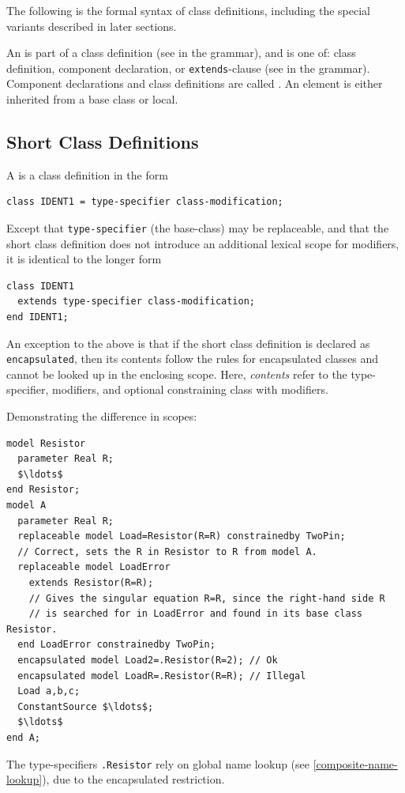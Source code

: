 The following is the formal syntax of class definitions, including the special variants described in later sections.

An  is part of a class definition (see  in the grammar), and is one of: class definition, component declaration, or \lstinline!extends!-clause (see  in the grammar).
Component declarations and class definitions are called .
An element is either inherited from a base class or local.

\subsection{Short Class Definitions}\label{short-class-definitions}

A  is a class definition in the form
\begin{lstlisting}[language=modelica]
class IDENT1 = type-specifier class-modification;
\end{lstlisting}
Except that \lstinline!type-specifier! (the base-class) may be replaceable, and that the short class definition does not introduce an additional lexical scope for modifiers, it is identical to the longer form
\begin{lstlisting}[language=modelica]
class IDENT1
  extends type-specifier class-modification;
end IDENT1;
\end{lstlisting}

An exception to the above is that if the short class definition is declared as \lstinline!encapsulated!, then its contents follow the rules for encapsulated classes and cannot be looked up in the enclosing scope.
Here, \emph{contents} refer to the type-specifier, modifiers, and optional constraining class with modifiers.

\begin{example}
Demonstrating the difference in scopes:
\begin{lstlisting}[language=modelica]
model Resistor
  parameter Real R;
  $\ldots$
end Resistor;
model A
  parameter Real R;
  replaceable model Load=Resistor(R=R) constrainedby TwoPin;
  // Correct, sets the R in Resistor to R from model A.
  replaceable model LoadError
    extends Resistor(R=R);
    // Gives the singular equation R=R, since the right-hand side R
    // is searched for in LoadError and found in its base class Resistor.
  end LoadError constrainedby TwoPin;
  encapsulated model Load2=.Resistor(R=2); // Ok
  encapsulated model LoadR=.Resistor(R=R); // Illegal
  Load a,b,c;
  ConstantSource $\ldots$;
  $\ldots$
end A;
\end{lstlisting}
The type-specifiers \lstinline!.Resistor! rely on global name lookup (see \ref{composite-name-lookup}), due to the encapsulated restriction.
\end{example}

